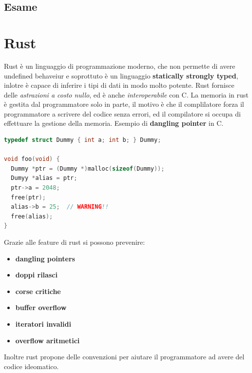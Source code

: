 \documentclass[12pt]{article}
\begin{document}
\subsection{Esame}













\newpage
\section{Rust}
Rust \`e un linguaggio di programmazione moderno, che non permette di avere undefined behaveiur e soprottuto \`e un linguaggio \textbf{statically strongly typed}, inlotre \`e capace di inferire i tipi di dati in modo molto potente. Rust fornisce delle \emph{astrazioni a costo nullo}, ed \`e anche \emph{interoperabile} con C. La memoria in rust \`e gestita dal programmatore solo in parte, il motivo \`e che il complilatore forza il programmatore a scrivere del codice senza errori, ed il compilatore si occupa di effettuare la gestione della memoria. Esempio di \textbf{dangling pointer} in C.
\begin{lstlisting}[language=c]
typedef struct Dummy { int a; int b; } Dummy;

void foo(void) {
  Dummy *ptr = (Dummy *)malloc(sizeof(Dummy));
  Dumyy *alias = ptr;
  ptr->a = 2048;
  free(ptr);
  alias->b = 25;  // WARNING!!
  free(alias);
}
\end{lstlisting}
Grazie alle feature di rust si possono prevenire:
\begin{itemize}
  \item \textbf{dangling pointers}
  \item \textbf{doppi rilasci}
  \item \textbf{corse critiche}
  \item \textbf{buffer overflow}
  \item \textbf{iteratori invalidi}
  \item \textbf{overflow aritmetici}
\end{itemize}
Inoltre rust propone delle convenzioni per aiutare il programmatore ad avere del codice ideomatico.
\end{document}
